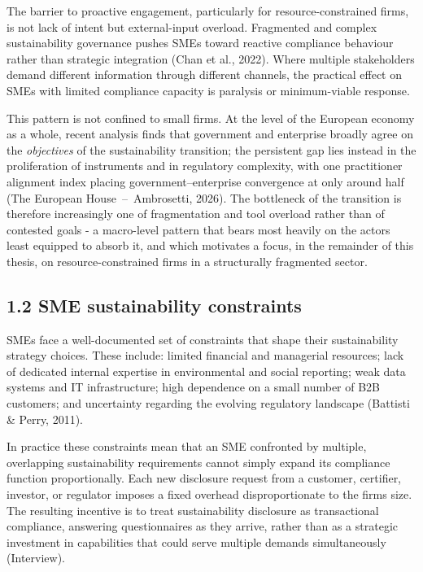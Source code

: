 \documentclass[
]{article}
\begin{document}
The barrier to proactive engagement, particularly for
resource-constrained firms, is not lack of intent but external-input
overload. Fragmented and complex sustainability governance pushes SMEs
toward reactive compliance behaviour rather than strategic integration
(Chan et al., 2022). Where multiple stakeholders demand different
information through different channels, the practical effect on SMEs
with limited compliance capacity is paralysis or minimum-viable
response.

This pattern is not confined to small firms. At the level of the European
economy as a whole, recent analysis finds that government and enterprise
broadly agree on the \emph{objectives} of the sustainability transition;
the persistent gap lies instead in the proliferation of instruments and in
regulatory complexity, with one practitioner alignment index placing
government--enterprise convergence at only around half
(The European House~--~Ambrosetti, 2026).%
The bottleneck of the transition is therefore increasingly one of
fragmentation and tool overload rather than of contested goals - a
macro-level pattern that bears most heavily on the actors least equipped
to absorb it, and which motivates a focus, in the remainder of this
thesis, on resource-constrained firms in a structurally fragmented
sector.

\subsection{1.2 SME sustainability
constraints}\label{sme-sustainability-constraints}

SMEs face a well-documented set of constraints that shape their
sustainability strategy choices. These include: limited financial and
managerial resources; lack of dedicated internal expertise in
environmental and social reporting; weak data systems and IT
infrastructure; high dependence on a small number of B2B customers; and
uncertainty regarding the evolving regulatory landscape (Battisti \&
Perry, 2011).

In practice these constraints mean that an SME confronted by multiple,
overlapping sustainability requirements cannot simply expand its
compliance function proportionally. Each new disclosure request from a
customer, certifier, investor, or regulator imposes a fixed overhead
disproportionate to the firm\textquotesingle s size. The resulting
incentive is to treat sustainability disclosure as transactional
compliance, answering questionnaires as they arrive, rather than as a
strategic investment in capabilities that could serve multiple demands
simultaneously (Interview).
\end{document}
